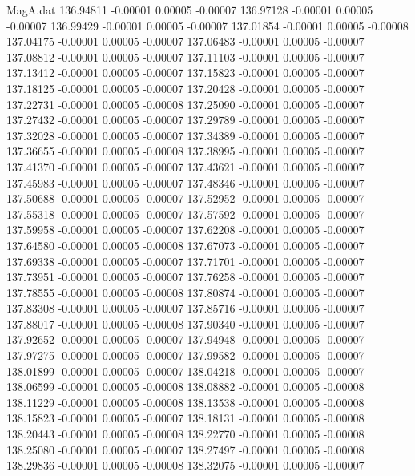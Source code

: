 \begin{filecontents}{MagA.dat}
 136.94811   -0.00001    0.00005   -0.00007
 136.97128   -0.00001    0.00005   -0.00007
 136.99429   -0.00001    0.00005   -0.00007
 137.01854   -0.00001    0.00005   -0.00008
 137.04175   -0.00001    0.00005   -0.00007
 137.06483   -0.00001    0.00005   -0.00007
 137.08812   -0.00001    0.00005   -0.00007
 137.11103   -0.00001    0.00005   -0.00007
 137.13412   -0.00001    0.00005   -0.00007
 137.15823   -0.00001    0.00005   -0.00007
 137.18125   -0.00001    0.00005   -0.00007
 137.20428   -0.00001    0.00005   -0.00007
 137.22731   -0.00001    0.00005   -0.00008
 137.25090   -0.00001    0.00005   -0.00007
 137.27432   -0.00001    0.00005   -0.00007
 137.29789   -0.00001    0.00005   -0.00007
 137.32028   -0.00001    0.00005   -0.00007
 137.34389   -0.00001    0.00005   -0.00007
 137.36655   -0.00001    0.00005   -0.00008
 137.38995   -0.00001    0.00005   -0.00007
 137.41370   -0.00001    0.00005   -0.00007
 137.43621   -0.00001    0.00005   -0.00007
 137.45983   -0.00001    0.00005   -0.00007
 137.48346   -0.00001    0.00005   -0.00007
 137.50688   -0.00001    0.00005   -0.00007
 137.52952   -0.00001    0.00005   -0.00007
 137.55318   -0.00001    0.00005   -0.00007
 137.57592   -0.00001    0.00005   -0.00007
 137.59958   -0.00001    0.00005   -0.00007
 137.62208   -0.00001    0.00005   -0.00007
 137.64580   -0.00001    0.00005   -0.00008
 137.67073   -0.00001    0.00005   -0.00007
 137.69338   -0.00001    0.00005   -0.00007
 137.71701   -0.00001    0.00005   -0.00007
 137.73951   -0.00001    0.00005   -0.00007
 137.76258   -0.00001    0.00005   -0.00007
 137.78555   -0.00001    0.00005   -0.00008
 137.80874   -0.00001    0.00005   -0.00007
 137.83308   -0.00001    0.00005   -0.00007
 137.85716   -0.00001    0.00005   -0.00007
 137.88017   -0.00001    0.00005   -0.00008
 137.90340   -0.00001    0.00005   -0.00007
 137.92652   -0.00001    0.00005   -0.00007
 137.94948   -0.00001    0.00005   -0.00007
 137.97275   -0.00001    0.00005   -0.00007
 137.99582   -0.00001    0.00005   -0.00007
 138.01899   -0.00001    0.00005   -0.00007
 138.04218   -0.00001    0.00005   -0.00007
 138.06599   -0.00001    0.00005   -0.00008
 138.08882   -0.00001    0.00005   -0.00008
 138.11229   -0.00001    0.00005   -0.00008
 138.13538   -0.00001    0.00005   -0.00008
 138.15823   -0.00001    0.00005   -0.00007
 138.18131   -0.00001    0.00005   -0.00008
 138.20443   -0.00001    0.00005   -0.00008
 138.22770   -0.00001    0.00005   -0.00008
 138.25080   -0.00001    0.00005   -0.00007
 138.27497   -0.00001    0.00005   -0.00008
 138.29836   -0.00001    0.00005   -0.00008
 138.32075   -0.00001    0.00005   -0.00007

\end{filecontents}
